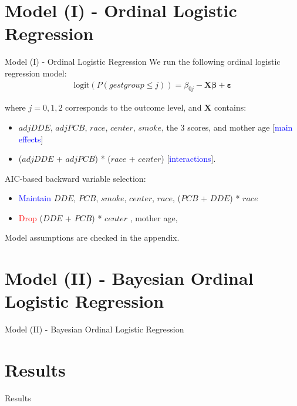 \documentclass{beamer}\usepackage[]{graphicx}\usepackage[]{color}
\begin{document}
\section{Model (I) - Ordinal Logistic Regression}
\begin{frame}{Model (I) - Ordinal Logistic Regression}
We run the following ordinal logistic regression model:
\begin{align*}
	\textrm{logit}(P(gestgroup \leq j)) = \beta_{0j} - \mathbf{X} \boldsymbol{\beta} + \boldsymbol{\varepsilon}
\end{align*}

where $j = 0,1,2$ corresponds to the outcome level, and \textbf{X} contains:
\begin{itemize}
	\item $adjDDE$, $adjPCB$, $race$, $center$, $smoke$, the 3 scores, and mother age [\textcolor{blue}{main effects}]
	\item ($adjDDE$ + $adjPCB$) * ($race$ + $center$) [\textcolor{blue}{interactions}].
\end{itemize}
\medskip
AIC-based backward variable selection:
\begin{itemize}
	\item \textcolor{blue}{Maintain} $DDE$, $PCB$, $smoke$, $center$, $race$, ($PCB$ + $DDE$) * $race$
	\item \textcolor{red}{Drop} ($DDE$ + $PCB$) * $center$ , mother age, 
\end{itemize}

Model assumptions are checked in the appendix.
\end{frame}


\section{Model (II) - Bayesian Ordinal Logistic Regression}
\begin{frame}{Model (II) - Bayesian Ordinal Logistic Regression}
\end{frame}

\section{Results}
\begin{frame}{Results}
\end{frame}
\end{document}
